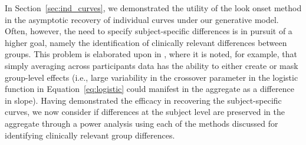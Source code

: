 \documentclass{article}
\begin{document}
In Section~\ref{sec:ind_curves}, we demonstrated the utility of the look onset method in the asymptotic recovery of individual curves under our generative model. Often, however, the need to specify subject-specific differences is in pursuit of a higher goal, namely the identification of clinically relevant differences between groups. This problem is elaborated upon in \citet{mcmurray2010individual}, where it is noted, for example, that simply averaging across participants data has the ability to either create or mask group-level effects (i.e., large variability in the crossover parameter in the logistic function in Equation~\ref{eq:logistic} could manifest in the aggregate as a difference in slope). Having demonstrated the efficacy in recovering the subject-specific curves, we now consider if differences at the subject level are preserved in the aggregate through a power analysis using each of the methods discussed for identifying clinically relevant group differences. 
\end{document}
